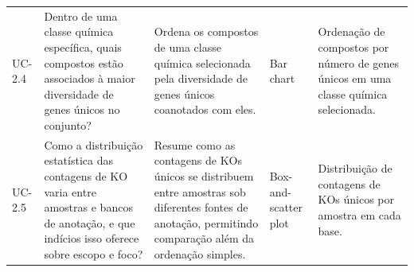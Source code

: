 \begin{landscape}
\begin{longtable}{>{\raggedright\arraybackslash}p{1.1cm} >{\raggedright\arraybackslash}p{5.0cm} >{\raggedright\arraybackslash}p{7.8cm} >{\raggedright\arraybackslash}p{4.2cm} >{\raggedright\arraybackslash}p{5.3cm}}
UC-2.4 & Dentro de uma classe química específica, quais compostos estão associados à maior diversidade de genes únicos no conjunto? & Ordena os compostos de uma classe química selecionada pela diversidade de genes únicos coanotados com eles. & Bar chart & Ordenação de compostos por número de genes únicos em uma classe química selecionada. \\
UC-2.5 & Como a distribuição estatística das contagens de KO varia entre amostras e bancos de anotação, e que indícios isso oferece sobre escopo e foco? & Resume como as contagens de KOs únicos se distribuem entre amostras sob diferentes fontes de anotação, permitindo comparação além da ordenação simples. & Box-and-scatter plot & Distribuição de contagens de KOs únicos por amostra em cada base. \\
\end{longtable}
\end{landscape}
\clearpage

